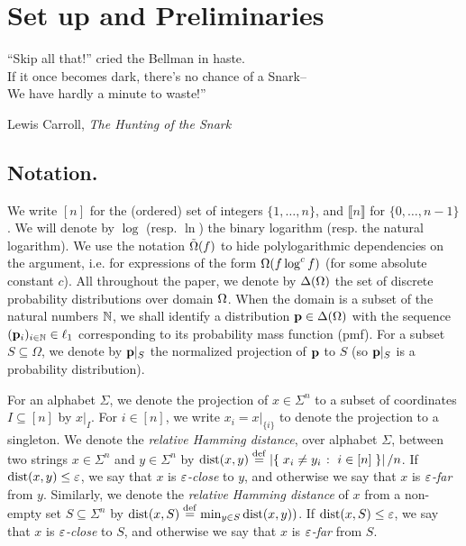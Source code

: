 \chapter{Set up and Preliminaries}\label{chap:preliminaries}

\epigraph{``Skip all that!'' cried the Bellman in haste.\\
If it once becomes dark, there's no chance of a Snark--\\
We have hardly a minute to waste!''}{Lewis Carroll, \textit{The Hunting of the Snark}}

\section{Notation.} We write $[n]$ for the (ordered) set of integers $\{1,\dots,n\}$, and $\llbracket n\rrbracket$ for $\{0,\dots,n-1\}$. We will denote by $\log$ (resp. $\ln$) the binary logarithm (resp. the natural logarithm). We use the notation $\tildeOmega{f}$ to hide polylogarithmic dependencies on the argument, i.e. for expressions of the form $\bigOmega{f \log^c f}$ (for some absolute constant $c$). All throughout the paper, we denote by $\distribs{\domain[\Omega]}$ the set of discrete probability distributions over domain $\domain[\Omega]$. When the domain is a subset of the natural numbers $\N$, we shall identify a distribution $\p\in\distribs{\domain[\Omega]}$ with the sequence $(\p_i)_{i\in\N}\in\lp[1]$ corresponding to its probability mass function (pmf). For a subset $S \subseteq \Omega$, we denote by $\p|_S$ the normalized projection of $\p$ to $S$ (so $\p|_S$ is a probability distribution).

For an alphabet $\Sigma$, we denote the projection of $x \in \Sigma^n$ to a subset of
  coordinates $I \subseteq [n]$ by $x|_I$. For $i \in [n]$, we write
  $x_i = x|_{\{i\}}$ to denote the projection to a singleton. We denote the \emph{relative Hamming distance}, over alphabet
  $\Sigma$, between two strings $x \in \Sigma^n$ and $y \in \Sigma^n$ by
  $\dist{x}{y} \eqdef \abs{ \setOfSuchThat{ x_i \neq y_i }{ i \in [n] } }/n$.
  If $\dist{x}{y} \leq \eps$, we say that $x$ is \emph{$\eps$-close}
  to $y$, and otherwise we say that $x$ is \emph{$\eps$-far} from
  $y$. Similarly, we denote the \emph{relative Hamming distance} of $x$ from
  a non-empty set $S \subseteq \Sigma^n$ by
  $\dist{x}{S} \eqdef \min_{y \in S} \dist{x}{y})$. If
  $\dist{x}{S} \leq \eps$, we say that $x$ is \emph{$\eps$-close} to
  $S$, and otherwise we say that $x$ is \emph{$\eps$-far} from $S$.


